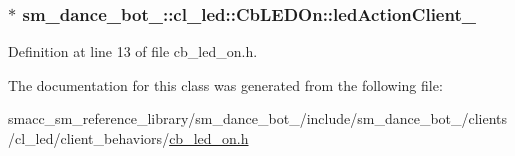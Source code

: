 \subsubsection[{\texorpdfstring{led\+Action\+Client\+\_\+}{ledActionClient_}}]{$\ast$ sm\+\_\+dance\+\_\+bot\+\_\+::cl\+\_\+led\+::\+Cb\+L\+E\+D\+On\+::led\+Action\+Client\+\_\+}\hypertarget{classsm__dance__bot__3_1_1cl__led_1_1CbLEDOn_aae93ba81c19acc13ce99b1cd938885ea}{}\label{classsm__dance__bot__3_1_1cl__led_1_1CbLEDOn_aae93ba81c19acc13ce99b1cd938885ea}


Definition at line 13 of file cb\+\_\+led\+\_\+on.\+h.



The documentation for this class was generated from the following file\+:\begin{DoxyCompactItemize}
\item 
smacc\+\_\+sm\+\_\+reference\+\_\+library/sm\+\_\+dance\+\_\+bot\+\_/include/sm\+\_\+dance\+\_\+bot\+\_/clients/cl\+\_\+led/client\+\_\+behaviors/\hyperlink{3_2include_2sm__dance__bot__3_2clients_2cl__led_2client__behaviors_2cb__led__on_8h}{cb\+\_\+led\+\_\+on.\+h}\end{DoxyCompactItemize}
